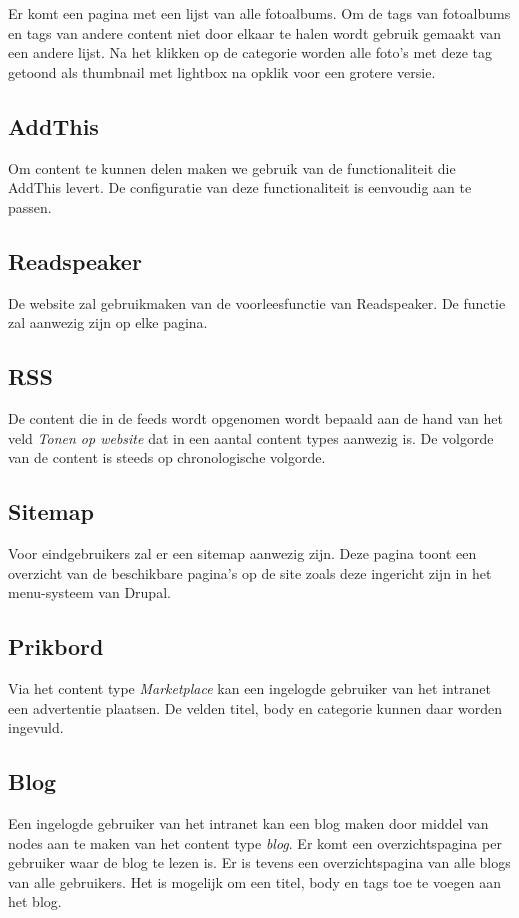 Er komt een pagina met een lijst van alle fotoalbums. Om de tags van fotoalbums en tags van andere content niet door elkaar te halen wordt gebruik gemaakt van een andere lijst. Na het klikken op de categorie worden alle foto's met deze tag getoond als thumbnail met lightbox na opklik voor een grotere versie.

\subsection{AddThis}
Om content te kunnen delen maken we gebruik van de functionaliteit die AddThis levert. De configuratie van deze functionaliteit is eenvoudig aan te passen.

\subsection{Readspeaker}
De website zal gebruikmaken van de voorleesfunctie van Readspeaker. De functie zal aanwezig zijn op elke pagina.

\subsection{RSS}
De content die in de feeds wordt opgenomen wordt bepaald aan de hand van het veld \emph{Tonen op website} dat in een aantal content types aanwezig is. De volgorde van de content is steeds op chronologische volgorde.

\subsection{Sitemap}
Voor eindgebruikers zal er een sitemap aanwezig zijn. Deze pagina toont een overzicht van de beschikbare pagina's op de site zoals deze ingericht zijn in het menu-systeem van Drupal.

\subsection{Prikbord}
Via het content type \emph{Marketplace} kan een ingelogde gebruiker van het intranet een advertentie plaatsen. De velden titel, body en categorie kunnen daar worden ingevuld. 

\subsection{Blog}
Een ingelogde gebruiker van het intranet kan een blog maken door middel van nodes aan te maken van het content type \emph{blog}. Er komt een overzichtspagina per gebruiker waar de blog te lezen is. Er is tevens een overzichtspagina van alle blogs van alle gebruikers. Het is mogelijk om een titel, body en tags toe te voegen aan het blog.

